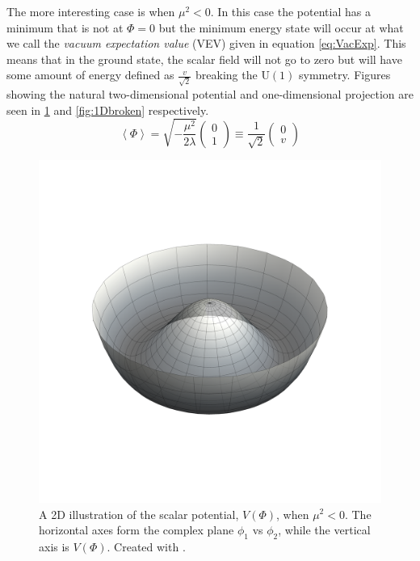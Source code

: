 The more interesting case is when $\mu^2 < 0$. In this case the potential has a minimum that is not at $\Phi = 0$ but the minimum energy state will occur at what we call the \textit{vacuum expectation value} (VEV) given in equation \eqref{eq:VacExp}. This means that in the ground state, the scalar field will not go to zero but will have some amount of energy defined as $\frac{v}{\sqrt{2}}$ breaking the $\mathrm{U}(1)$ symmetry. Figures showing the natural two-dimensional potential and one-dimensional projection are seen in \ref{fig:2Dbroken} and \ref{fig:1Dbroken} respectively. 
\begin{equation}
\label{eq:VacExp}
\left<\Phi\right> = \sqrt{-\frac{\mu^2}{2\lambda}} \begin{pmatrix} 0 \\ 1 \end{pmatrix} \equiv \frac{1}{\sqrt{2}} \begin{pmatrix} 0 \\ v \end{pmatrix}
\end{equation}

\begin{figure}
\begin{center}
\includegraphics[width=0.75\linewidth]{Introduction/Mexican_Hat.pdf}
\caption[A 2D illustration of the scalar potential, $V\left(\Phi\right)$, when $\mu^2 < 0$. The horizontal axes form the complex plane $\phi_{1}$ vs $\phi_{2}$, while the vertical axis is $V\left(\Phi\right)$.]{A 2D illustration of the scalar potential, $V\left(\Phi\right)$, when $\mu^2 < 0$. The horizontal axes form the complex plane $\phi_{1}$ vs $\phi_{2}$, while the vertical axis is $V\left(\Phi\right)$. Created with \cite{Mathematica10_1}.}
\label{fig:2Dbroken}
\end{center}
\end{figure}

